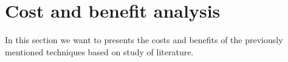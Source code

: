 \section{Cost and benefit analysis}
In this section we want to presents the costs and benefits of the previously mentioned techniques based on study of literature.

